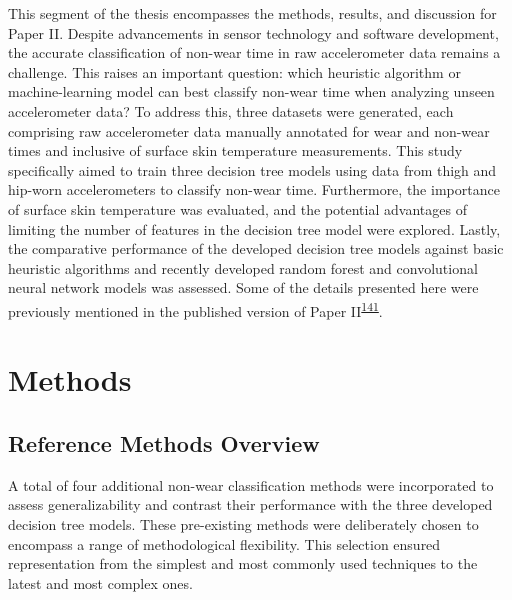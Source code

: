 \documentclass[
  10pt,
]{scrbook}
\begin{document}
This segment of the thesis encompasses the methods, results, and
discussion for Paper II. Despite advancements in sensor technology and
software development, the accurate classification of non-wear time in
raw accelerometer data remains a challenge. This raises an important
question: which heuristic algorithm or machine-learning model can best
classify non-wear time when analyzing unseen accelerometer data? To
address this, three datasets were generated, each comprising raw
accelerometer data manually annotated for wear and non-wear times and
inclusive of surface skin temperature measurements. This study
specifically aimed to train three decision tree models using data from
thigh and hip-worn accelerometers to classify non-wear time.
Furthermore, the importance of surface skin temperature was evaluated,
and the potential advantages of limiting the number of features in the
decision tree model were explored. Lastly, the comparative performance
of the developed decision tree models against basic heuristic algorithms
and recently developed random forest and convolutional neural network
models was assessed. Some of the details presented here were previously
mentioned in the published version of Paper
II\textsuperscript{\protect\hyperlink{ref-skovgaard_generalizability_2023}{141}}.

\hypertarget{methods-1}{%
\section{Methods}\label{methods-1}}

\hypertarget{reference-methods-overview}{%
\subsection{Reference Methods
Overview}\label{reference-methods-overview}}

A total of four additional non-wear classification methods were
incorporated to assess generalizability and contrast their performance
with the three developed decision tree models. These pre-existing
methods were deliberately chosen to encompass a range of methodological
flexibility. This selection ensured representation from the simplest and
most commonly used techniques to the latest and most complex ones.
\end{document}
